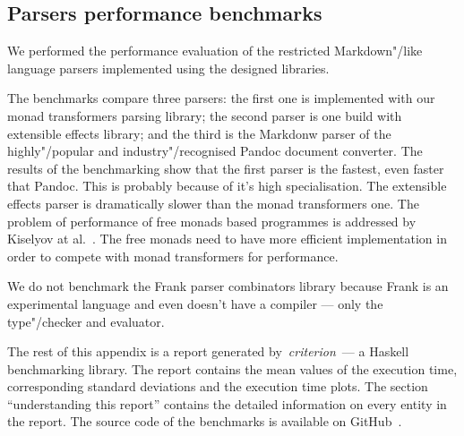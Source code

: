 \begin{appendices}

\chapter{Parsers performance benchmarks}

We performed the performance evaluation of the restricted Markdown"/like language parsers
implemented using the designed libraries.

The benchmarks compare three parsers: the first one is implemented with our monad
transformers parsing library; the second parser is one build with extensible effects
library; and the third is the Markdonw parser of the highly"/popular and
industry"/recognised Pandoc document converter. The results of the benchmarking show
that the first parser is the fastest, even faster that Pandoc. This is probably because of
it's high specialisation. The extensible effects parser is dramatically slower than
the monad transformers one. The problem of performance of free monads based programmes
is addressed by Kiselyov at al.~\cite{Kiselyov:2015:FMM:2887747.2804319}.
The free monads need to have more efficient implementation in order to
compete with monad transformers for performance.

We do not benchmark the Frank parser combinators library because Frank is an
experimental language and even doesn't have a compiler --- only the type"/checker and
evaluator.

The rest of this appendix is a report generated by~\emph{criterion}~---
a Haskell benchmarking library. The report contains the mean values of the
execution time, corresponding standard deviations and the execution time plots.
The section ``understanding this report'' contains the detailed information on
every entity in the report. The source code of the benchmarks is available on
GitHub~\cite{parsers-benchmarks}.



\end{appendices}